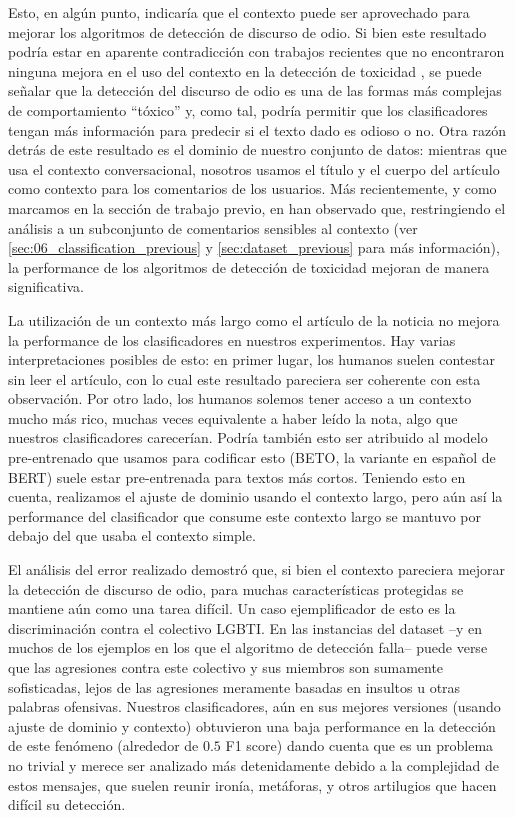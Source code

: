 Esto, en algún punto, indicaría que el contexto puede ser aprovechado para mejorar los algoritmos de detección de discurso de odio. Si bien este resultado podría estar en aparente contradicción con trabajos recientes que no encontraron ninguna mejora en el uso del contexto en la detección de toxicidad \cite{pavlopoulos2020toxicity}, se puede señalar que la detección del discurso de odio es una de las formas más complejas de comportamiento ``tóxico'' y, como tal, podría permitir que los clasificadores tengan más información para predecir si el texto dado es odioso o no. Otra razón detrás de este resultado es el dominio de nuestro conjunto de datos: mientras que \citet{pavlopoulos2020toxicity} usa el contexto conversacional, nosotros usamos el título y el cuerpo del artículo como contexto para los comentarios de los usuarios. Más recientemente, y como marcamos en la sección de trabajo previo, en \citet{xenos-2021-context} han observado que, restringiendo el análisis a un subconjunto de comentarios sensibles al contexto (ver \ref{sec:06_classification_previous} y \ref{sec:dataset_previous} para más información), la performance de los algoritmos de detección de toxicidad mejoran de manera significativa.

La utilización de un contexto más largo como el artículo de la noticia no mejora la performance de los clasificadores en nuestros experimentos. Hay varias interpretaciones posibles de esto: en primer lugar, los humanos suelen contestar sin leer el artículo, con lo cual este resultado pareciera ser coherente con esta observación. Por otro lado, los humanos solemos tener acceso a un contexto mucho más rico, muchas veces equivalente a haber leído la nota, algo que nuestros clasificadores carecerían. Podría también esto ser atribuido al modelo pre-entrenado que usamos para codificar esto (BETO, la variante en español de BERT) suele estar pre-entrenada para textos más cortos. Teniendo esto en cuenta, realizamos el ajuste de dominio usando el contexto largo, pero aún así la performance del clasificador que consume este contexto largo se mantuvo por debajo del que usaba el contexto simple.

El análisis del error realizado demostró que, si bien el contexto pareciera mejorar la detección de discurso de odio, para muchas características protegidas se mantiene aún como una tarea difícil. Un caso ejemplificador de esto es la discriminación contra el colectivo LGBTI. En las instancias del dataset --y en muchos de los ejemplos en los que el algoritmo de detección falla--  puede verse que las agresiones contra este colectivo y sus miembros son sumamente sofisticadas, lejos de las agresiones meramente basadas en insultos u otras palabras ofensivas. Nuestros clasificadores, aún en sus mejores versiones (usando ajuste de dominio y contexto) obtuvieron una baja performance en la detección de este fenómeno (alrededor de $0.5$ F1 score) dando cuenta que es un problema no trivial y merece ser analizado más detenidamente debido a la complejidad de estos mensajes, que suelen reunir ironía, metáforas, y otros artilugios que hacen difícil su detección.

